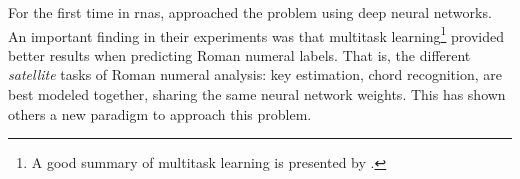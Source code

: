 

For the first time in \glspl{rna},
\textcite{chen2018functional} approached the problem using
deep neural networks. An important finding in their
experiments was that multitask learning\footnote{A good
summary of multitask learning is presented by
\textcite{ruder2017overview}.} provided better results when
predicting Roman numeral labels. That is, the different
\emph{satellite} tasks of Roman numeral analysis: key
estimation, chord recognition, are best modeled together,
sharing the same neural network weights. This has shown
others a new paradigm to approach this problem.
